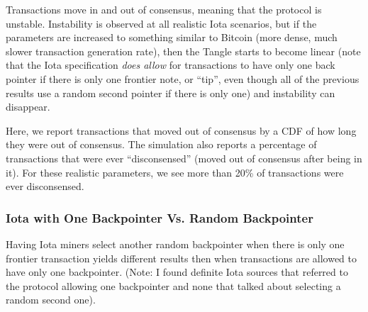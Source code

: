 \documentclass[letterpaper,11pt]{article}
\begin{document}
Transactions move in and out of consensus, meaning that the protocol is unstable. Instability is observed at all realistic Iota scenarios, but if the parameters are increased to something similar to Bitcoin (more dense, much slower transaction generation rate), then the Tangle starts to become linear (note that the Iota specification \textit{does allow} for transactions to have only one back pointer if there is only one frontier note, or ``tip'', even though all of the previous results use a random second pointer if there is only one) and instability can disappear.

Here, we report transactions that moved out of consensus by a CDF of how long they were out of consensus. The simulation also reports a percentage of transactions that were ever ``disconsensed'' (moved out of consensus after being in it). For these realistic parameters, we see more than 20\% of transactions were ever disconsensed.

\subsubsection{Iota with One Backpointer Vs. Random Backpointer}
Having Iota miners select another random backpointer when there is only one frontier transaction yields different results then when transactions are allowed to have only one backpointer. (Note: I found definite Iota sources that referred to the protocol allowing one backpointer and none that talked about selecting a random second one).
\end{document}
